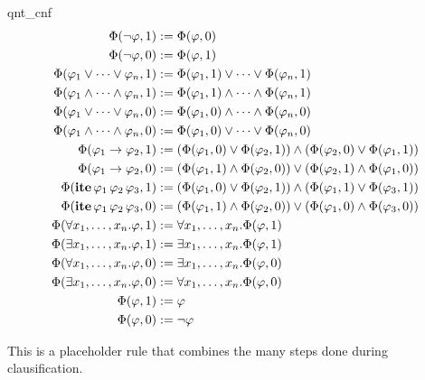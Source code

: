 \begin{RuleDescription}{qnt_cnf}
\begin{align*}
\Phi(\neg \varphi, 1) &:= \Phi(\varphi, 0) \\
\Phi(\neg \varphi, 0) &:= \Phi(\varphi, 1) \\
\Phi(\varphi_1 \lor\dots\lor\varphi_n, 1) &:= \Phi(\varphi_1, 1)\lor\dots\lor\Phi(\varphi_n, 1) \\
\Phi(\varphi_1 \land\dots\land\varphi_n, 1) &:= \Phi(\varphi_1, 1)\land\dots\land\Phi(\varphi_n, 1) \\
\Phi(\varphi_1 \lor\dots\lor\varphi_n, 0) &:= \Phi(\varphi_1, 0)\land\dots\land\Phi(\varphi_n, 0) \\
\Phi(\varphi_1 \land\dots\land\varphi_n, 0) &:= \Phi(\varphi_1, 0)\lor\dots\lor\Phi(\varphi_n, 0) \\
\Phi(\varphi_1 \rightarrow \varphi_2, 1) &:= (\Phi(\varphi_1, 0) \lor \Phi(\varphi_2, 1)) \land
                                                    (\Phi(\varphi_2, 0) \lor \Phi(\varphi_1, 1)) \\
\Phi(\varphi_1 \rightarrow \varphi_2, 0) &:= (\Phi(\varphi_1, 1) \land \Phi(\varphi_2, 0)) \lor
                                                    (\Phi(\varphi_2, 1) \land \Phi(\varphi_1, 0)) \\
\Phi(\mathbf{ite}\,\varphi_1\,\varphi_2\,\varphi_3, 1) &:=
             (\Phi(\varphi_1, 0) \lor \Phi(\varphi_2, 1)) \land (\Phi(\varphi_1, 1) \lor \Phi(\varphi_3, 1)) \\
\Phi(\mathbf{ite}\,\varphi_1\,\varphi_2\,\varphi_3, 0) &:=
             (\Phi(\varphi_1, 1) \land \Phi(\varphi_2, 0)) \lor (\Phi(\varphi_1, 0) \land \Phi(\varphi_3, 0)) \\
\Phi(\forall x_1, \dots, x_n. \varphi, 1) &:= \forall x_1, \dots, x_n. \Phi(\varphi, 1) \\
\Phi(\exists x_1, \dots, x_n. \varphi, 1) &:= \exists x_1, \dots, x_n. \Phi(\varphi, 1) \\
\Phi(\forall x_1, \dots, x_n. \varphi, 0) &:= \exists x_1, \dots, x_n. \Phi(\varphi, 0) \\
\Phi(\exists x_1, \dots, x_n. \varphi, 0) &:= \forall x_1, \dots, x_n. \Phi(\varphi, 0) \\
\Phi(\varphi, 1) &:= \varphi \\
\Phi(\varphi, 0) &:= \neg\varphi
\end{align*}

 This is a placeholder rule that combines the many steps
done during clausification.
\end{RuleDescription}

